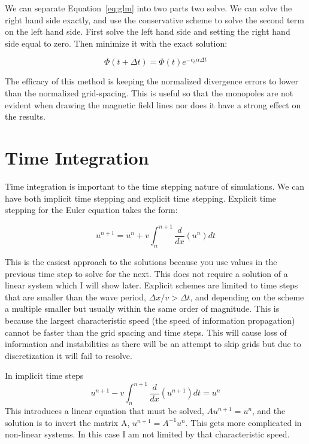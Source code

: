 \documentclass[12pt,upcase]{umlthesis}
\begin{document}
We can separate Equation~\ref{eq:glm} into two parts two solve. We can solve the right hand side exactly, and use the conservative scheme to solve the second term on the left hand side. First solve the left hand side and setting the right hand side equal to zero. Then minimize it with the exact solution:

\begin{equation}
	\Phi(t+\Delta t) = \Phi(t) e^{-c_h\alpha\Delta t}
\end{equation}

The efficacy of this method is keeping the normalized divergence errors to lower than the normalized grid-spacing. This is useful so that the monopoles are not evident when drawing the magnetic field lines nor does it have a strong effect on the results.

\section{Time Integration}\label{sec:timeintegration}

Time integration is important to the time stepping nature of simulations. We can have both implicit time stepping and explicit time stepping. Explicit time stepping for the Euler equation takes the form:

\begin{equation}\label{eq:explicit}
	u^{n+1} = u^n + v\int^{n+1}_n \frac{d}{dx}(u^{n}) dt
\end{equation}

This is the easiest approach to the solutions because you use values in the previous time step to solve for the next. This does not require a solution of a linear system which I will show later. Explicit schemes are limited to time steps that are smaller than the wave period, $\Delta x / v > \Delta t$, and depending on the scheme a multiple smaller but usually within the same order of magnitude. This is because the largest characteristic speed (the speed of information propagation) cannot be faster than the grid spacing and time steps. This will cause loss of information and instabilities as there will be an attempt to skip grids but due to discretization it will fail to resolve.

In implicit time steps
\begin{equation}\label{eq:implicit}
	u^{n+1} - v\int^{n+1}_n \frac{d}{dx}(u^{n+1}) dt = u^n 
\end{equation}
This introduces a linear equation that must be solved, $Au^{n+1} = u^n$, and the solution is to invert the matrix A, $u^{n+1} = A^{-1} u^n$. This gets more complicated in non-linear systems. In this case I am not limited by that characteristic speed.
\end{document}
